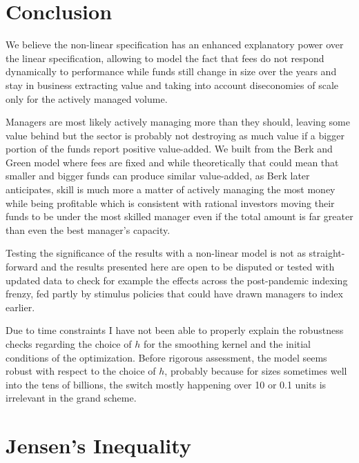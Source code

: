 \documentclass[12pt]{article}
\begin{document}
\section{Conclusion}
We believe the non-linear specification has an enhanced explanatory power over the linear specification, allowing to model the fact that fees do not respond dynamically to performance while funds still change in size over the years and stay in business extracting value and taking into account diseconomies of scale only for the actively managed volume. 

\par Managers are most likely actively managing more than they should, leaving some value behind but the sector is probably not destroying as much value if a bigger portion of the funds report positive value-added. We built from the Berk and Green model where fees are fixed and while theoretically that could mean that smaller and bigger funds can produce similar value-added, as Berk later anticipates, skill is much more a matter of actively managing the most money while being profitable which is consistent with rational investors moving their funds to be under the most skilled manager even if the total amount is far greater than even the best manager's capacity.

\par
Testing the significance of the results with a non-linear model is not as straight-forward and the results presented here are open to be disputed or tested with updated data to check for example the effects across the post-pandemic indexing frenzy, fed partly by stimulus policies that could have drawn managers to index earlier. 

\par Due to time constraints I have not been able to properly explain the robustness checks regarding the choice of $h$ for the smoothing kernel and the initial conditions of the optimization. Before rigorous assessment, the model seems robust with respect to the choice of $h$, probably because for sizes sometimes well into the tens of billions, the switch mostly happening over 10 or 0.1 units is irrelevant in the grand scheme.










\newpage
\printbibliography


\appendix
\section{Jensen's Inequality}
\label{app:jensen}
\end{document}
